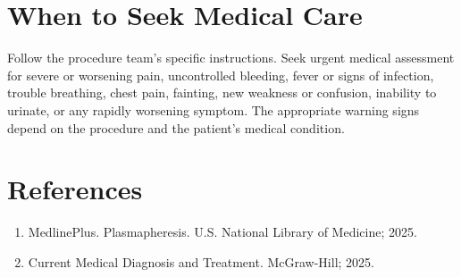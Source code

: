 \section*{When to Seek Medical Care}
Follow the procedure team's specific instructions. Seek urgent medical assessment for severe or worsening pain, uncontrolled bleeding, fever or signs of infection, trouble breathing, chest pain, fainting, new weakness or confusion, inability to urinate, or any rapidly worsening symptom. The appropriate warning signs depend on the procedure and the patient's medical condition.

\section*{References}
\begin{enumerate}
  \item MedlinePlus. Plasmapheresis. U.S. National Library of Medicine; 2025.
  \item Current Medical Diagnosis and Treatment. McGraw-Hill; 2025.
\end{enumerate}

\clearpage

